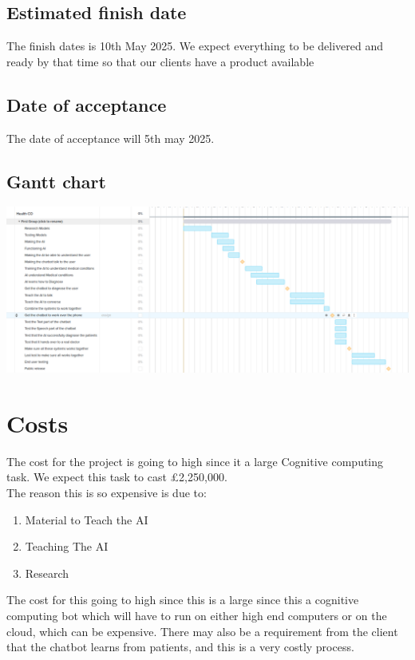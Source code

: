\documentclass{article}
\begin{document}
\subsection{Estimated finish date}

The finish dates is 10th May 2025. We expect everything to be delivered and ready by that time so that our clients have a product available 

\subsection{Date of acceptance}
The date of acceptance will 5th may 2025.  

\subsection{Gantt chart}
\includegraphics[scale=0.25]{gantt}






\section{Costs}
The cost for the project is going to high since it a large Cognitive computing task. We expect this task to cast £2,250,000. \\
The reason this is so expensive is due to:
\begin{enumerate}
	\item Material to Teach the AI
	\item Teaching The AI
	\item Research 
\end{enumerate}
The cost for this going to high since this is a large since this a cognitive computing bot which will have to run on either high end computers or on the cloud, which can be expensive. There may also be a requirement from the client that the chatbot learns from patients, and this is a very costly process.
\end{document}
